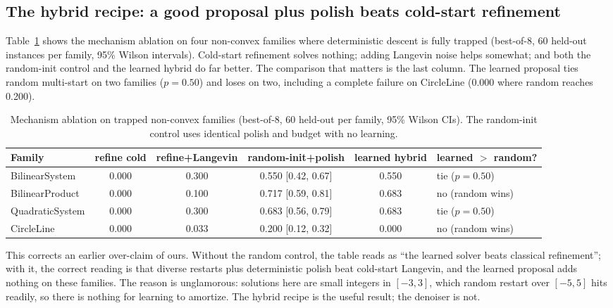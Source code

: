 \documentclass[11pt]{article}
\begin{document}
\subsection{The hybrid recipe: a good proposal plus polish beats cold-start refinement}
\label{sec:hybrid}

Table~\ref{tab:hybrid} shows the mechanism ablation on four non-convex families where
deterministic descent is fully trapped (best-of-8, 60 held-out instances per family, 95\%
Wilson intervals). Cold-start refinement solves nothing; adding Langevin noise helps somewhat;
and both the random-init control and the learned hybrid do far better. The comparison that
matters is the last column. The learned proposal ties random multi-start on two families
($p = 0.50$) and loses on two, including a complete failure on CircleLine (0.000 where random
reaches 0.200).

\begin{table}[t]
\centering
\caption{Mechanism ablation on trapped non-convex families (best-of-8, 60 held-out per
family, 95\% Wilson CIs). The random-init control uses identical polish and budget with no
learning.}
\label{tab:hybrid}
\footnotesize
\begin{tabular}{lccccl}
\toprule
Family & refine cold & refine+Langevin & random-init+polish & learned hybrid & learned $>$ random? \\
\midrule
BilinearSystem  & 0.000 & 0.300 & 0.550 [0.42, 0.67] & 0.550 & tie ($p = 0.50$) \\
BilinearProduct & 0.000 & 0.100 & 0.717 [0.59, 0.81] & 0.683 & no (random wins) \\
QuadraticSystem & 0.000 & 0.300 & 0.683 [0.56, 0.79] & 0.683 & tie ($p = 0.50$) \\
CircleLine      & 0.000 & 0.033 & 0.200 [0.12, 0.32] & 0.000 & no (random wins) \\
\bottomrule
\end{tabular}
\end{table}

This corrects an earlier over-claim of ours. Without the random control, the table reads as
``the learned solver beats classical refinement''; with it, the correct reading is that
diverse restarts plus deterministic polish beat cold-start Langevin, and the learned proposal
adds nothing on these families. The reason is unglamorous: solutions here are small integers
in $[-3,3]$, which random restart over $[-5,5]$ hits readily, so there is nothing for learning
to amortize. The hybrid recipe is the useful result; the denoiser is not.
\end{document}
